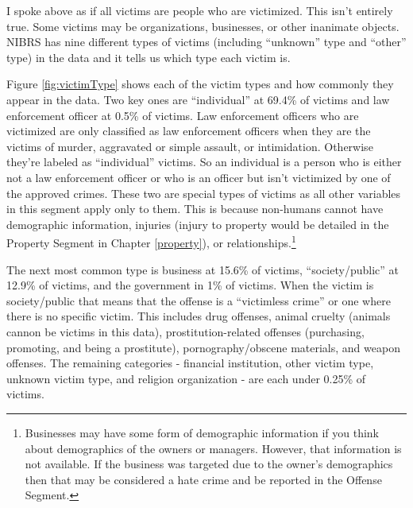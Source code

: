 \documentclass[
  12pt,
  openany]{book}
\begin{document}
I spoke above as if all victims are people who are victimized. This isn't entirely true. Some victims may be organizations, businesses, or other inanimate objects. NIBRS has nine different types of victims (including ``unknown'' type and ``other'' type) in the data and it tells us which type each victim is.

Figure \ref{fig:victimType} shows each of the victim types and how commonly they appear in the data. Two key ones are ``individual'' at 69.4\% of victims and law enforcement officer at 0.5\% of victims. Law enforcement officers who are victimized are only classified as law enforcement officers when they are the victims of murder, aggravated or simple assault, or intimidation. Otherwise they're labeled as ``individual'' victims. So an individual is a person who is either not a law enforcement officer or who is an officer but isn't victimized by one of the approved crimes. These two are special types of victims as all other variables in this segment apply only to them. This is because non-humans cannot have demographic information, injuries (injury to property would be detailed in the Property Segment in Chapter \ref{property}), or relationships.\footnote{Businesses may have some form of demographic information if you think about demographics of the owners or managers. However, that information is not available. If the business was targeted due to the owner's demographics then that may be considered a hate crime and be reported in the Offense Segment.}

The next most common type is business at 15.6\% of victims, ``society/public'' at 12.9\% of victims, and the government in 1\% of victims. When the victim is society/public that means that the offense is a ``victimless crime'' or one where there is no specific victim. This includes drug offenses, animal cruelty (animals cannon be victims in this data), prostitution-related offenses (purchasing, promoting, and being a prostitute), pornography/obscene materials, and weapon offenses. The remaining categories - financial institution, other victim type, unknown victim type, and religion organization - are each under 0.25\% of victims.
\end{document}
